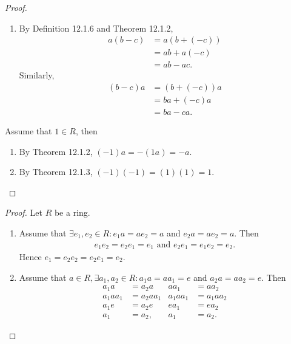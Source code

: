 \documentclass{article}
\newtheorem{theorem}{Theorem}[section]
\theoremstyle{definition}
\begin{document}
\begin{proof}
\begin{enumerate}
            \item By Definition 12.1.6 and Theorem 12.1.2,
            \begin{align*}
                a(b-c)&=a(b+(-c)) \\
                &= ab+a(-c)\\
                &= ab-ac.
            \end{align*}
            Similarly,
            \begin{align*}
                (b-c)a&=(b+(-c))a\\
                &=ba+(-c)a\\
                &=ba-ca.
            \end{align*}
        \end{enumerate}
        
        Assume that $1\in R$, then
        \begin{enumerate}[resume]
            \item By Theorem 12.1.2, $(-1)a=-(1a)=-a$.
            
            \item By Theorem 12.1.3, $(-1)(-1)=(1)(1)=1$.
        \end{enumerate}
    \end{proof}
    
    \noindent{}
    
    \begin{proof}
        Let $R$ be a ring.
        \begin{enumerate}
            \item Assume that $\exists e_1,e_2\in R:e_1a=ae_2=a$ and $e_2a=ae_2=a$. Then
            \begin{align*}
                e_1e_2=e_2e_1=e_1 \text{ and } e_2e_1=e_1e_2=e_2.
            \end{align*}
            Hence $e_1=e_2e_2=e_2e_1=e_2$.
            
            \item Assume that $a\in R, \exists a_1,a_2\in R: a_1a=aa_1=e$ and $a_2a=aa_2=e$. Then
            \begin{align*}
                a_1a&=a_2a & aa_1&=aa_2\\
                a_1aa_1&=a_2aa_1 & a_1aa_1&=a_1aa_2 \\
                a_1e&=a_2e & ea_1&=ea_2\\
                a_1&=a_2, & a_1&=a_2.
            \end{align*}
        \end{enumerate}
    \end{proof}
    
\end{document}
